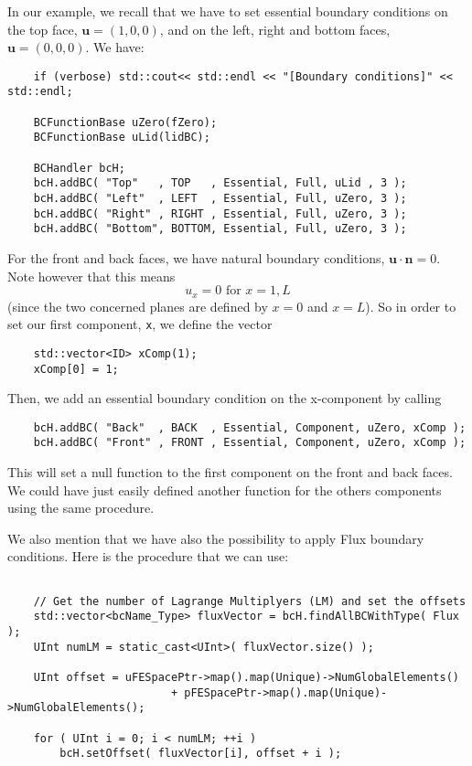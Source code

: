 In our example, we recall that we have to set essential boundary conditions on the top face, $\bm{u}=(1,0,0)$, and on the left, right and bottom faces, $\bm{u}=(0,0,0)$. We have:
\begin{verbatim}
    if (verbose) std::cout<< std::endl << "[Boundary conditions]" << std::endl;

    BCFunctionBase uZero(fZero);
    BCFunctionBase uLid(lidBC);

    BCHandler bcH;
    bcH.addBC( "Top"   , TOP   , Essential, Full, uLid , 3 );
    bcH.addBC( "Left"  , LEFT  , Essential, Full, uZero, 3 );
    bcH.addBC( "Right" , RIGHT , Essential, Full, uZero, 3 );
    bcH.addBC( "Bottom", BOTTOM, Essential, Full, uZero, 3 );
\end{verbatim}

For the front and back faces, we have natural boundary conditions, $\bm{u}\cdot \bm{n}=0$. Note however that this means
\begin{equation*}
u_x = 0 \mbox{ for } x=1, L
\end{equation*}
(since the two concerned planes are defined by $x = 0$ and $x = L$).
So in order to set our first component, \verb!x!, we define the vector

\begin{verbatim}
    std::vector<ID> xComp(1);
    xComp[0] = 1;
\end{verbatim} 



\noindent Then, we add an essential boundary condition on the x-component by calling
\begin{verbatim}
    bcH.addBC( "Back"  , BACK  , Essential, Component, uZero, xComp );
    bcH.addBC( "Front" , FRONT , Essential, Component, uZero, xComp );
\end{verbatim}

\noindent This will set a null function to the first component on the front and back faces. We could have just easily defined
another function for the others components using the same procedure.

We also mention that we have also the possibility to apply Flux boundary conditions. Here is the procedure that we can use:

\begin{verbatim}

    // Get the number of Lagrange Multiplyers (LM) and set the offsets
    std::vector<bcName_Type> fluxVector = bcH.findAllBCWithType( Flux );
    UInt numLM = static_cast<UInt>( fluxVector.size() );

    UInt offset = uFESpacePtr->map().map(Unique)->NumGlobalElements()
                         + pFESpacePtr->map().map(Unique)->NumGlobalElements();

    for ( UInt i = 0; i < numLM; ++i )
        bcH.setOffset( fluxVector[i], offset + i );
\end{verbatim}

